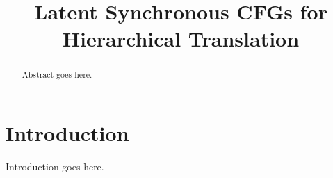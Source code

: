 \documentclass[11pt]{article}
\title{Latent Synchronous CFGs for Hierarchical Translation}
\date{}
\begin{document}
\maketitle
\begin{abstract}
  Abstract goes here.  
\end{abstract}

\section{Introduction}
Introduction goes here. 

\end{document}
